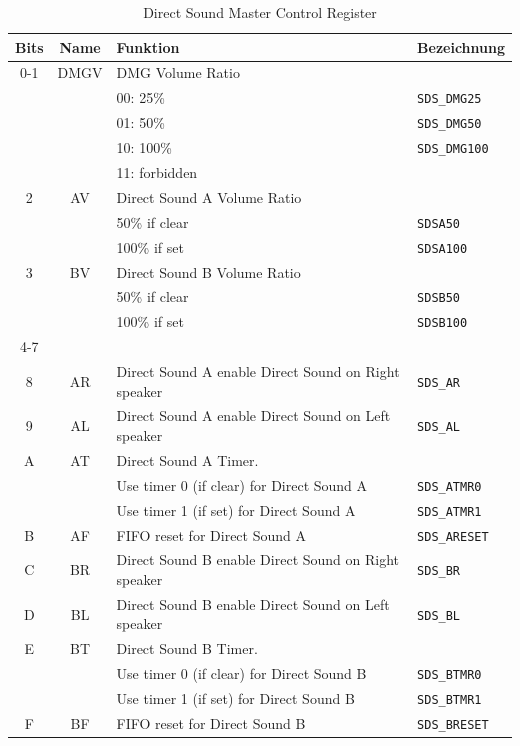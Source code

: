 \documentclass[11pt,a4paper]{scrartcl}
\begin{document}
\begin{table}[h]
	\centering
    \begin{tabular}{ c | c | p{10cm} | l } 
	    \textbf{Bits} & \textbf{Name} & \textbf{Funktion} & \textbf{Bezeichnung} \\
	    \hline
	    0-1 & DMGV & DMG Volume Ratio & \\
	        &      & 00: 25\% & \verb|SDS_DMG25| \\
	        &      & 01: 50\% & \verb|SDS_DMG50| \\
	        &      & 10: 100\% & \verb|SDS_DMG100| \\
	        &      & 11: forbidden \\
	    \hline
	    2 & AV & Direct Sound A Volume Ratio & \\
	      &    & 50\% if clear & \verb|SDSA50| \\
	      &    & 100\% if set  & \verb|SDSA100| \\
        \hline
	    3 & BV & Direct Sound B Volume Ratio & \\
	      &    & 50\% if clear & \verb|SDSB50| \\
	      &    & 100\% if set  & \verb|SDSB100| \\
	    \hline
	    4-7 & & & \\
	    \hline
	    8 & AR & Direct Sound A enable Direct Sound on Right speaker & \verb|SDS_AR| \\
	    \hline
	    9 & AL & Direct Sound A enable Direct Sound on Left speaker & \verb|SDS_AL| \\
	    \hline
	    A & AT & Direct Sound A Timer. & \\
	       &   & Use timer 0 (if clear) for Direct Sound A & \verb|SDS_ATMR0| \\
	       &   & Use timer 1 (if set) for Direct Sound A & \verb|SDS_ATMR1| \\
	    \hline
	    B & AF & FIFO reset for Direct Sound A & \verb|SDS_ARESET| \\
	    \hline
	    C & BR & Direct Sound B enable Direct Sound on Right speaker & \verb|SDS_BR| \\
	    \hline
	    D & BL & Direct Sound B enable Direct Sound on Left speaker & \verb|SDS_BL| \\
	    \hline
	    E & BT & Direct Sound B Timer. & \\
	       &   & Use timer 0 (if clear) for Direct Sound B & \verb|SDS_BTMR0| \\
	       &   & Use timer 1 (if set) for Direct Sound B & \verb|SDS_BTMR1| \\
	    \hline
	    F & BF & FIFO reset for Direct Sound B & \verb|SDS_BRESET| \\
	\end{tabular}
	\caption{Direct Sound Master Control Register}
	\label{table:DirectSoundMasterControlRegister}
\end{table}
\end{document}
